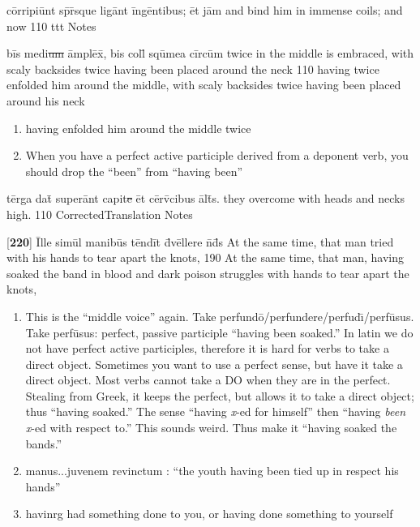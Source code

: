 \latline
  {c\=orr\-ip\-i\=unt sp\={\macron {\i}}r\={\macron {\i}}squ\-e l\-ig\=ant \=ing\=ent\-ib\-us; \=et j\=am}
  { and bind him in immense coils; and now  }
  {110}
	{ttt}
  { Notes }


\latline
  {b\=is m\-ed\-i\sout{um }\=ampl\=ex\={\macron {\i}}, b\-is c\-oll\={} squ\={}m\-e\-a c\=irc\=um}
  { twice in the middle is embraced, with scaly backsides twice having been placed around the neck   }
  {110}
  { having twice enfolded him around the middle, with scaly backsides twice having been placed around his neck }
  { \begin{enumerate}
  	\item having enfolded him around the middle twice
  	\item When you have a perfect active participle derived from a deponent verb, you should drop the ``been'' from ``having been''
  \end{enumerate} }


\latline
  {t\=erg\-a d\-at\={\macron {\i}} s\-up\-er\=ant c\-ap\-it\sout{e }\=et c\=erv\={\macron {\i}}c\-ib\-us \=alt\={\macron {\i}}s.}
  { they overcome with heads and necks high. }
  {110}
  { CorrectedTranslation }
  { Notes }


\latline
  {[\textbf{220}] \=Ill\-e s\-im\=ul m\-an\-ib\=us t\=end\=it d\={\macron {\i}}v\=ell\-er\-e n\={}d\={}s}
  { At the same time, that man tried with his hands to tear apart the knots, }
  {190}
  { At the same time, that man, having soaked the band in blood and dark poison struggles with hands to tear apart the knots, }
  { \begin{enumerate}
  	\item This is the ``middle voice'' again. Take perfund\={o}/perfundere/perfud\={\i}/perf\={u}sus. Take perf\={u}sus: perfect,
    passive participle ``having been soaked.'' In latin we do not have perfect active participles, therefore it is hard for verbs
    to take a direct object. Sometimes you want to use a perfect sense, but have it take a direct object. Most verbs cannot take a
    DO when they are in the perfect. Stealing from Greek, it keeps the perfect, but allows it to take a direct object; thus
    ``having soaked.'' The sense ``having \emph{x}-ed for himself'' then ``having \emph{been }\emph{x}-ed with respect to.'' This
    sounds weird. Thus make it ``having soaked the bands.''
		\item manus...juvenem revinctum :  ``the youth having been tied up in respect his hands''
		\item havinrg had something done to you, or having done something to yourself
  \end{enumerate} }


